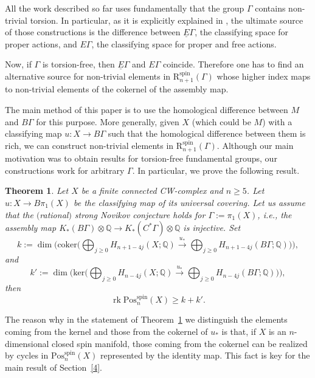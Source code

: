 \documentclass[pdftex]{sigma}
\numberwithin{equation}{section}
\newtheorem{Theorem}{Theorem}[section]
\def\QQ{\ensuremath{\mathbb{Q}}}
\DeclareMathOperator{\spin}{spin}
\begin{document}
 All the work described so far uses fundamentally that
 the group
 $\Gamma$ contains non-trivial torsion. In particular, as it is explicitly
 explained in
 \cite{XieYuZeidler}, the ultimate source of those constructions is the
 difference between $\underline{E}\Gamma$, the classifying space for proper
 actions, and $E\Gamma$, the classifying space for proper and free
 actions.

 Now, if $\Gamma$ is torsion-free, then $\underline{E}\Gamma$ and $E\Gamma$
 coincide. Therefore one has to find an alternative source for non-trivial
 elements in $\mathrm{R}^{\spin}_{n+1}(\Gamma)$ whose higher index maps to
 non-trivial elements of the cokernel of the assembly map.

 The main method of this paper is to use the homological difference between
 $M$ and $B\Gamma$ for this purpose. More generally, given $X$ (which could
 be $M$) with a classifying map $u\colon X\to B\Gamma$ such that the homological
 difference between them is rich, we can construct non-trivial elements in
 $\mathrm{R}^{\spin}_{n+1}(\Gamma)$. Although our main motivation was to
 obtain results for torsion-free fundamental groups, our constructions
 work for arbitrary $\Gamma$. In particular, we prove the following
 result.

 \begin{Theorem}\label{lower-bound} Let $X$ be a finite connected CW-complex
 and $n\ge 5$. Let $u\colon X\to B\pi_1(X)$ be the classifying map of its universal covering.
 Let us assume that the $($rational$)$ strong Novikov conjecture holds for
 $\Gamma:=\pi_1(X)$, i.e., the assembly map $K_*(B\Gamma)\otimes\QQ\to
 K_*(C^*\Gamma)\otimes\QQ$ is injective. Set
 \[k:= \dim\bigg(\mathrm{coker}\bigg(\bigoplus_{j\geq0}H_{n+1-4j}(X;\QQ)\xrightarrow{u_*}\bigoplus_{j\geq0}H_{n+1-4j}(B\Gamma;\QQ)\bigg)\bigg), \]
 and
 \[k':= \dim\bigg(\mathrm{ker}\bigg(\bigoplus_{j\geq0}H_{n-4j}(X;\QQ)\xrightarrow{u_*}\bigoplus_{j\geq0}H_{n-4j}(B\Gamma;\QQ)\bigg)\bigg),\]
 then
 \[\operatorname{rk} \mathrm{Pos}^{\spin}_{n}(X)\geq k+k'.\]
 \end{Theorem}

 The reason why in the statement of Theorem~\ref{lower-bound} we
 distinguish the elements coming from the kernel and those from the cokernel
 of $u_*$ is that, if $X$ is an $n$-dimensional closed spin manifold, those coming
 from the cokernel can be realized by cycles in $ \mathrm{Pos}^{\spin}_{n}(X)$
 represented by the identity map. This fact is key for the main result of
 Section~\ref{4}.
\end{document}
